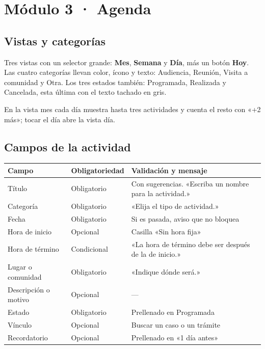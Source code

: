 \documentclass[11pt,a4paper]{article}
\begin{document}


\section{Módulo 3 · Agenda}

\subsection{Vistas y categorías}

Tres vistas con un selector grande: \textbf{Mes}, \textbf{Semana} y \textbf{Día}, más un botón \textbf{Hoy}. Las cuatro categorías llevan color, ícono y texto: Audiencia, Reunión, Visita a comunidad y Otra. Los tres estados también: Programada, Realizada y Cancelada, esta última con el texto tachado en gris.

En la vista mes cada día muestra hasta tres actividades y cuenta el resto con «+2 más»; tocar el día abre la vista día.

\subsection{Campos de la actividad}

\begin{center}
\small
\begin{tabular}{@{}p{3.0cm}p{2.4cm}p{8.8cm}@{}}
\toprule
\textbf{Campo} & \textbf{Obligatoriedad} & \textbf{Validación y mensaje} \\
\midrule
Título & Obligatorio & Con sugerencias. «Escriba un nombre para la actividad.» \\
Categoría & Obligatorio & «Elija el tipo de actividad.» \\
Fecha & Obligatorio & Si es pasada, aviso que no bloquea \\
Hora de inicio & Opcional & Casilla «Sin hora fija» \\
Hora de término & Condicional & «La hora de término debe ser después de la de inicio.» \\
Lugar o comunidad & Obligatorio & «Indique dónde será.» \\
Descripción o motivo & Opcional & --- \\
Estado & Obligatorio & Prellenado en Programada \\
Vínculo & Opcional & Buscar un caso o un trámite \\
Recordatorio & Opcional & Prellenado en «1 día antes» \\
\bottomrule
\end{tabular}
\end{center}
\end{document}
